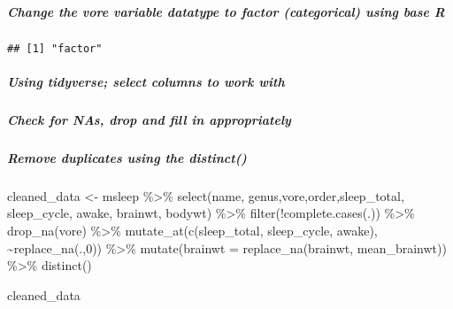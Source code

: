 \documentclass[
]{article}
\newenvironment{Shaded}{\begin{snugshade}}{\end{snugshade}}
\newcommand{\AttributeTok}[1]{\textcolor[rgb]{0.77,0.63,0.00}{#1}}
\newcommand{\DecValTok}[1]{\textcolor[rgb]{0.00,0.00,0.81}{#1}}
\newcommand{\FunctionTok}[1]{\textcolor[rgb]{0.00,0.00,0.00}{#1}}
\newcommand{\NormalTok}[1]{#1}
\newcommand{\OtherTok}[1]{\textcolor[rgb]{0.56,0.35,0.01}{#1}}
\newcommand{\SpecialCharTok}[1]{\textcolor[rgb]{0.00,0.00,0.00}{#1}}
\newcommand{\StringTok}[1]{\textcolor[rgb]{0.31,0.60,0.02}{#1}}
\begin{document}
\hypertarget{change-the-vore-variable-datatype-to-factor-categorical-using-base-r}{%
\subparagraph{Change the vore variable datatype to factor (categorical)
using base
R}\label{change-the-vore-variable-datatype-to-factor-categorical-using-base-r}}

\begin{Shaded}
\end{Shaded}

\begin{verbatim}
## [1] "factor"
\end{verbatim}

\hypertarget{using-tidyverse-select-columns-to-work-with}{%
\subparagraph{Using tidyverse; select columns to work
with}\label{using-tidyverse-select-columns-to-work-with}}

\hypertarget{check-for-nas-drop-and-fill-in-appropriately}{%
\subparagraph{Check for NAs, drop and fill in
appropriately}\label{check-for-nas-drop-and-fill-in-appropriately}}

\hypertarget{remove-duplicates-using-the-distinct}{%
\subparagraph{\texorpdfstring{Remove duplicates using the
\textbf{\emph{distinct()}}}{Remove duplicates using the distinct()}}\label{remove-duplicates-using-the-distinct}}

\begin{Shaded}
\begin{Highlighting}[]
\NormalTok{cleaned\_data }\OtherTok{\textless{}{-}}\NormalTok{ msleep }\SpecialCharTok{\%\textgreater{}\%} 
  \FunctionTok{select}\NormalTok{(name, genus,vore,order,sleep\_total, sleep\_cycle, awake, brainwt, bodywt) }\SpecialCharTok{\%\textgreater{}\%} 
  \FunctionTok{filter}\NormalTok{(}\SpecialCharTok{!}\FunctionTok{complete.cases}\NormalTok{(.)) }\SpecialCharTok{\%\textgreater{}\%} 
  \FunctionTok{drop\_na}\NormalTok{(vore) }\SpecialCharTok{\%\textgreater{}\%} 
  \FunctionTok{mutate\_at}\NormalTok{(}\FunctionTok{c}\NormalTok{(}\StringTok{\textquotesingle{}sleep\_total\textquotesingle{}}\NormalTok{, }\StringTok{\textquotesingle{}sleep\_cycle\textquotesingle{}}\NormalTok{, }\StringTok{\textquotesingle{}awake\textquotesingle{}}\NormalTok{), }\SpecialCharTok{\textasciitilde{}}\FunctionTok{replace\_na}\NormalTok{(.,}\DecValTok{0}\NormalTok{)) }\SpecialCharTok{\%\textgreater{}\%} 
  \FunctionTok{mutate}\NormalTok{(}\AttributeTok{brainwt =} \FunctionTok{replace\_na}\NormalTok{(brainwt, mean\_brainwt)) }\SpecialCharTok{\%\textgreater{}\%}
  \FunctionTok{distinct}\NormalTok{()}

\NormalTok{cleaned\_data}
\end{Highlighting}
\end{Shaded}
\end{document}
